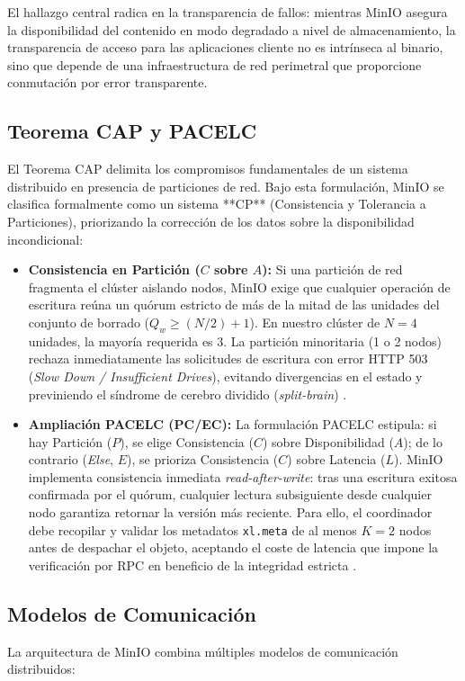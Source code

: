 \documentclass[12pt,a4paper]{article}
\begin{document}
El hallazgo central radica en la transparencia de fallos: mientras MinIO asegura la disponibilidad del contenido en modo degradado a nivel de almacenamiento, la transparencia de acceso para las aplicaciones cliente no es intrínseca al binario, sino que depende de una infraestructura de red perimetral que proporcione conmutación por error transparente.

\subsection{Teorema CAP y PACELC}
El Teorema CAP delimita los compromisos fundamentales de un sistema distribuido en presencia de particiones de red. Bajo esta formulación, MinIO se clasifica formalmente como un sistema **CP** (Consistencia y Tolerancia a Particiones), priorizando la corrección de los datos sobre la disponibilidad incondicional:

\begin{itemize}[leftmargin=*]
    \item \textbf{Consistencia en Partición ($C$ sobre $A$):} Si una partición de red fragmenta el clúster aislando nodos, MinIO exige que cualquier operación de escritura reúna un quórum estricto de más de la mitad de las unidades del conjunto de borrado ($Q_w \ge (N/2) + 1$). En nuestro clúster de $N=4$ unidades, la mayoría requerida es $3$. La partición minoritaria (1 o 2 nodos) rechaza inmediatamente las solicitudes de escritura con error HTTP 503 (\emph{Slow Down / Insufficient Drives}), evitando divergencias en el estado y previniendo el síndrome de cerebro dividido (\emph{split-brain}) \cite{malhotra2025evaluating}.
    \item \textbf{Ampliación PACELC (PC/EC):} La formulación PACELC estipula: si hay Partición ($P$), se elige Consistencia ($C$) sobre Disponibilidad ($A$); de lo contrario (\emph{Else}, $E$), se prioriza Consistencia ($C$) sobre Latencia ($L$). MinIO implementa consistencia inmediata \emph{read-after-write}: tras una escritura exitosa confirmada por el quórum, cualquier lectura subsiguiente desde cualquier nodo garantiza retornar la versión más reciente. Para ello, el coordinador debe recopilar y validar los metadatos \texttt{xl.meta} de al menos $K=2$ nodos antes de despachar el objeto, aceptando el coste de latencia que impone la verificación por RPC en beneficio de la integridad estricta \cite{gadban2021s3hpc,chung2026smallstart}.
\end{itemize}

\subsection{Modelos de Comunicación}
La arquitectura de MinIO combina múltiples modelos de comunicación distribuidos:
\end{document}
